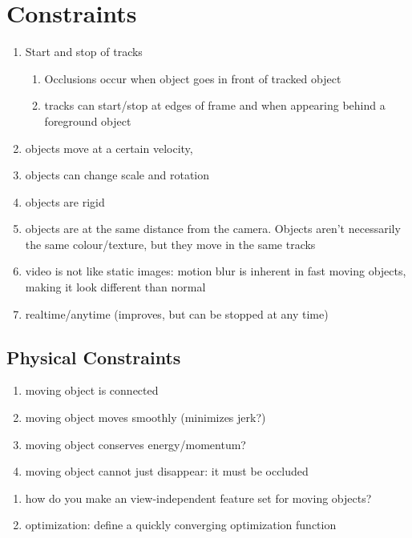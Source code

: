 \section{Constraints}
\begin{enumerate}
	\item Start and stop of tracks
	\begin{enumerate}
		\item Occlusions occur when object goes in front of tracked object
		\item tracks can start/stop at edges of frame and when appearing behind a foreground object
	\end{enumerate}
	\item objects move at a certain velocity, 
	\item objects can change scale and rotation
	\item objects are rigid
	\item objects are at the same distance from the camera. Objects aren't necessarily the same colour/texture, but they move in the same tracks
	\item video is not like static images: motion blur is inherent in fast moving objects, making it look different than normal
	\item realtime/anytime (improves, but can be stopped at any time)
\end{enumerate}

\subsection{Physical Constraints}
\begin{enumerate}
\item moving object is connected
\item moving object moves smoothly (minimizes jerk?)
\item moving object conserves energy/momentum?
\item moving object cannot just disappear: it must be occluded
\end{enumerate}

\begin{enumerate}
\item how do you make an view-independent feature set for moving objects?
\item optimization: define a quickly converging optimization function
\end{enumerate}



